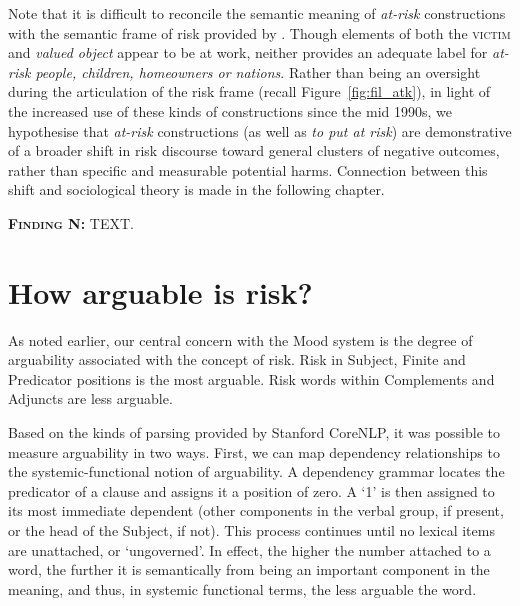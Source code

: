         Note that it is difficult to reconcile the semantic meaning of \emph{at-risk} constructions with the semantic frame of risk provided by . Though elements of both the \textsc{victim} and \emph{valued object} appear to be at work, neither provides an adequate label for \emph{at-risk people, children, homeowners or nations}. Rather than being an oversight during the articulation of the risk frame (recall Figure~\ref{fig:fil_atk}), in light of the increased use of these kinds of constructions since the mid 1990s, we hypothesise that \emph{at-risk} constructions (as well as \emph{to put at risk}) are demonstrative of a broader shift in risk discourse toward general clusters of negative outcomes, rather than specific and measurable potential harms. Connection between this shift and sociological theory is made in the following chapter.

  \noindent\colorbox{yellow!20}{%
  \parbox{1\textwidth}{%
  \textsc{\textbf{Finding N:}} TEXT.}}

	\section{How arguable is risk?} \label{sect:arguability}
	\FloatBarrier

		As noted earlier, our central concern with the Mood system is the degree of arguability associated with the concept of risk. Risk in Subject, Finite and Predicator positions is the most arguable. Risk words within Complements and Adjuncts are less arguable.


		Based on the kinds of parsing provided by Stanford CoreNLP, it was possible to measure arguability in two ways. First, we can map dependency relationships to the systemic-functional notion of arguability. A dependency grammar locates the predicator of a clause and assigns it a position of zero. A `1' is then assigned to its most immediate dependent (other components in the verbal group, if present, or the head of the Subject, if not). This process continues until no lexical items are unattached, or `ungoverned'. In effect, the higher the number attached to a word, the further it is semantically from being an important component in the meaning, and thus, in systemic functional terms, the less arguable the word.

